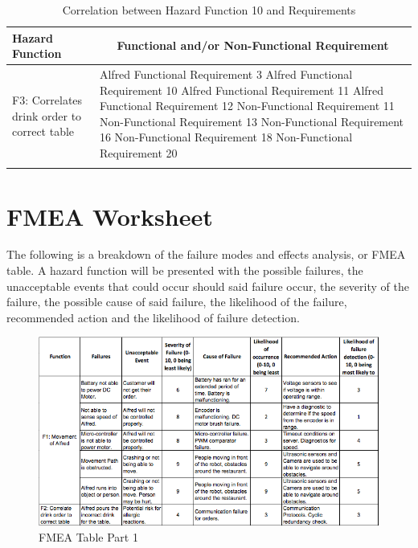 \documentclass [10pt]{article}
\begin{document}

\begin{longtable}{| p{ } | p{ } |}
\hline 
\centering \textbf{Hazard Function} & 
\multicolumn{1}{c}{\textbf {Functional and/or Non-Functional Requirement}}\\ \hline
\multirow{7}{*}{F3: Correlates drink order to correct table} & 
		{Alfred Functional Requirement 3 \newline
		Alfred Functional Requirement 10 \newline
		Alfred Functional Requirement 11 \newline
		Alfred Functional Requirement 12 \newline
		Non-Functional Requirement 11 \newline
		Non-Functional Requirement 13 \newline
		Non-Functional Requirement 16 \newline
		Non-Functional Requirement 18 \newline
		Non-Functional Requirement 20} \\ 
\hline 
\caption{Correlation between Hazard Function 10 and Requirements}  
\end{longtable}

\pagebreak

\section{FMEA Worksheet}

The following is a breakdown of the failure modes and effects analysis, or FMEA table. A hazard function will be presented with the possible failures, the unacceptable events that could occur should said failure occur, the severity of the failure, the possible cause of said failure, the likelihood of the failure, recommended action and the likelihood of failure detection.

\begin{figure} [h!]
	\centering
	\includegraphics [scale = 0.7] {figures/FMEA_1.png}
	\caption{FMEA Table Part 1}
\end{figure}
\end{document}
